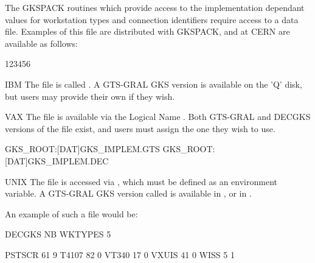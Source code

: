 The GKSPACK routines which provide access to the implementation
dependant values for workstation types and connection identifiers
require access to a data file.
Examples of this file are distributed with GKSPACK,
and at CERN are available as follows:
\begin{DLtt}{123456}
\item[IBM]The file is called .
A GTS-GRAL GKS version is available on the 'Q' disk, but users may provide
their own if they wish.
\item[VAX]The file is available via the Logical Name
.
Both GTS-GRAL and DECGKS versions of the file exist,
and users must assign the one they wish to use.
\begin{XMP}
GKS_ROOT:[DAT]GKS_IMPLEM.GTS
GKS_ROOT:[DAT]GKS_IMPLEM.DEC
\end{XMP}
\item[UNIX]The file is accessed via ,
which must be defined as an environment variable.
A GTS-GRAL GKS version called  is available in
, or in .
\end{DLtt}
An example of such a file would be:
\begin{XMP}
DECGKS
NB WKTYPES    5
 
PSTSCR            61     9
T4107             82     0
VT340             17     0
VXUIS             41     0
WISS               5     1
\end{XMP}
